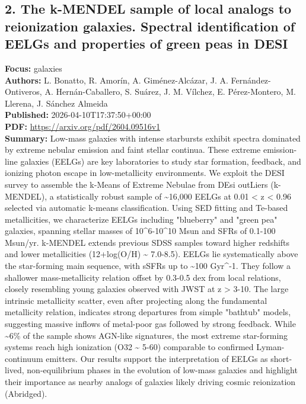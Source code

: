 \documentclass[11pt]{article}
\begin{document}
\subsection*{2. The k-MENDEL sample of local analogs to reionization galaxies. Spectral identification of EELGs and properties of green peas in DESI}
\textbf{Focus:} galaxies\\
\textbf{Authors:} L. Bonatto, R. Amorín, A. Giménez-Alcázar, J. A. Fernández-Ontiveros, A. Hernán-Caballero, S. Suárez, J. M. Vílchez, E. Pérez-Montero, M. Llerena, J. Sánchez Almeida\\
\textbf{Published:} 2026-04-10T17:37:50+00:00\\
\textbf{PDF:} \href{https://arxiv.org/pdf/2604.09516v1}{https://arxiv.org/pdf/2604.09516v1}\\
\textbf{Summary:}
Low-mass galaxies with intense starbursts exhibit spectra dominated by extreme nebular emission and faint stellar continua. These extreme emission-line galaxies (EELGs) are key laboratories to study star formation, feedback, and ionizing photon escape in low-metallicity environments. We exploit the DESI survey to assemble the k-Means of Extreme Nebulae from DEsi outLiers (k-MENDEL), a statistically robust sample of \textasciitilde{}16,000 EELGs at 0.01 < z < 0.96 selected via automatic k-means classification. Using SED fitting and Te-based metallicities, we characterize EELGs including "blueberry" and "green pea" galaxies, spanning stellar masses of 10\textasciicircum{}6-10\textasciicircum{}10 Msun and SFRs of 0.1-100 Msun/yr. k-MENDEL extends previous SDSS samples toward higher redshifts and lower metallicities (12+log(O/H) \textasciitilde{} 7.0-8.5). EELGs lie systematically above the star-forming main sequence, with sSFRs up to \textasciitilde{}100 Gyr\textasciicircum{}-1. They follow a shallower mass-metallicity relation offset by 0.3-0.5 dex from local relations, closely resembling young galaxies observed with JWST at z > 3-10. The large intrinsic metallicity scatter, even after projecting along the fundamental metallicity relation, indicates strong departures from simple "bathtub" models, suggesting massive inflows of metal-poor gas followed by strong feedback. While \textasciitilde{}6\% of the sample shows AGN-like signatures, the most extreme star-forming systems reach high ionization (O32 \textasciitilde{} 5-60) comparable to confirmed Lyman-continuum emitters. Our results support the interpretation of EELGs as short-lived, non-equilibrium phases in the evolution of low-mass galaxies and highlight their importance as nearby analogs of galaxies likely driving cosmic reionization (Abridged).
\end{document}
